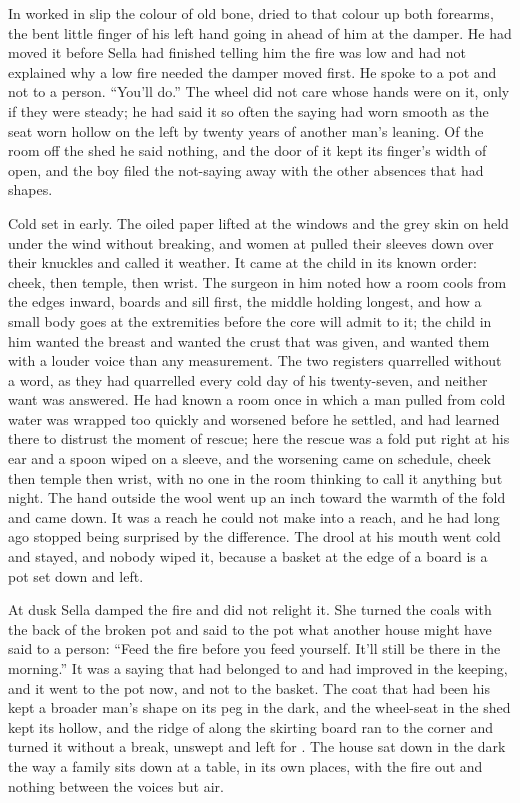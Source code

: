 In   worked in slip the colour of old bone, dried to that colour up both forearms, the bent little finger of his left hand going in ahead of him at the damper. He had moved it before Sella had finished telling him the fire was low and had not explained why a low fire needed the damper moved first. He spoke to a pot and not to a person. “You'll do.” The wheel did not care whose hands were on it, only if they were steady; he had said it so often the saying had worn smooth as the seat worn hollow on the left by twenty years of another man's leaning. Of the room off the shed he said nothing, and the door of it kept its finger's width of open, and the boy filed the not-saying away with the other absences that had shapes.

Cold set in early. The oiled paper lifted at the windows and the grey skin on  held under the wind without breaking, and women at  pulled their sleeves down over their knuckles and called it weather. It came at the child in its known order: cheek, then temple, then wrist. The surgeon in him noted how a room cools from the edges inward, boards and sill first, the middle holding longest, and how a small body goes at the extremities before the core will admit to it; the child in him wanted the breast and wanted the crust that was given, and wanted them with a louder voice than any measurement. The two registers quarrelled without a word, as they had quarrelled every cold day of his twenty-seven, and neither want was answered. He had known a room once in which a man pulled from cold water was wrapped too quickly and worsened before he settled, and had learned there to distrust the moment of rescue; here the rescue was a fold put right at his ear and a spoon wiped on a sleeve, and the worsening came on schedule, cheek then temple then wrist, with no one in the room thinking to call it anything but night. The hand outside the wool went up an inch toward the warmth of the fold and came down. It was a reach he could not make into a reach, and he had long ago stopped being surprised by the difference. The drool at his mouth went cold and stayed, and nobody wiped it, because a basket at the edge of a board is a pot set down and left.

\scenebreak

At dusk Sella damped the fire and did not relight it. She turned the coals with the back of the broken pot and said to the pot what another house might have said to a person: “Feed the fire before you feed yourself. It'll still be there in the morning.” It was a saying that had belonged to  and had improved in the keeping, and it went to the pot now, and not to the basket. The coat that had been his kept a broader man's shape on its peg in the dark, and the wheel-seat in the shed kept its hollow, and the ridge of  along the skirting board ran to the corner and turned it without a break, unswept and left for . The house sat down in the dark the way a family sits down at a table, in its own places, with the fire out and nothing between the voices but air.

